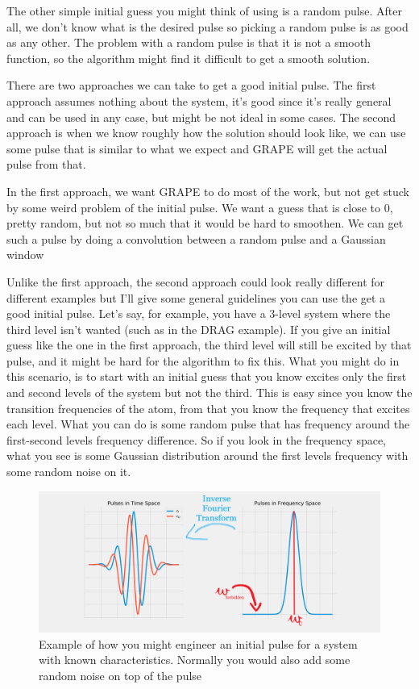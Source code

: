 The other simple initial guess you might think of using is a random pulse. After all, we don't know what is the desired pulse so picking a random pulse is as good as any other. The problem with a random pulse is that it is not a smooth function, so the algorithm might find it difficult to get a smooth solution.

There are two approaches we can take to get a good initial pulse. The first approach assumes nothing about the system, it's good since it's really general and can be used in any case, but might be not ideal in some cases. The second approach is when we know roughly how the solution should look like, we can use some pulse that is similar to what we expect and GRAPE will get the actual pulse from that.

In the first approach, we want GRAPE to do most of the work, but not get stuck by some weird problem of the initial pulse. We want a guess that is close to 0, pretty random, but not so much that it would be hard to smoothen. We can get such a pulse by doing a convolution between a random pulse and a Gaussian window 

Unlike the first approach, the second approach could look really different for different examples but I'll give some general guidelines you can use the get a good initial pulse. Let's say, for example, you have a 3-level system where the third level isn't wanted (such as in the DRAG example). If you give an initial guess like the one in the first approach, the third level will still be excited by that pulse, and it might be hard for the algorithm to fix this. What you might do in this scenario, is to start with an initial guess that you know excites only the first and second levels of the system but not the third. This is easy since you  know the transition frequencies of the atom, from that you know the frequency that excites each level. What you can do is some random pulse that has frequency around the first-second levels frequency difference. So if you look in the frequency space, what you see is some Gaussian distribution around the first levels frequency with some random noise on it.

\begin{figure}[H]
    \centering
    \includegraphics[width=1\columnwidth]{exaple-of-engineered-guess-edited.png}
    \caption{Example of how you might engineer an initial pulse for a system with known characteristics. Normally you would also add some random noise on top of the pulse}
    \label{fig:example-engineered-initial-guess}
\end{figure}
